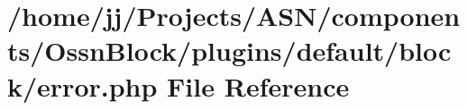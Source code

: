 \hypertarget{components_2_ossn_block_2plugins_2default_2block_2error_8php}{}\section{/home/jj/\+Projects/\+A\+S\+N/components/\+Ossn\+Block/plugins/default/block/error.php File Reference}
\label{components_2_ossn_block_2plugins_2default_2block_2error_8php}
